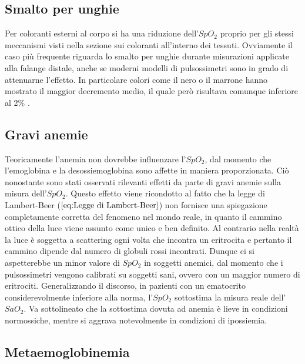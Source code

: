 \documentclass[12pt,a4paper, twoside, openright]{report}
\begin{document}
\subsection{Smalto per unghie}

Per coloranti esterni al corpo si ha una riduzione dell'$SpO_2$ proprio per gli stessi meccanismi visti nella sezione sui coloranti all'interno dei tessuti. 
Ovviamente il caso più frequente riguarda lo smalto per unghie durante misurazioni applicate alla falange distale, anche se moderni modelli di pulsossimetri sono in grado di attenuarne l'effetto. 
In particolare colori come il nero o il marrone hanno mostrato il maggior decremento medio, il quale però risultava comunque inferiore al 2\% \cite{Pulseoximeter}.%


\subsection{Gravi anemie}

Teoricamente l'anemia non dovrebbe influenzare l'$SpO_2$, dal momento che l'emoglobina e la desossiemoglobina sono affette in maniera proporzionata. 
Ciò nonostante sono stati osservati rilevanti effetti da parte di gravi anemie sulla misura dell'$SpO_2$. 
Questo effetto viene ricondotto al fatto che la legge di Lambert-Beer ($\ref{eq:Legge di Lambert-Beer}$) non fornisce una spiegazione completamente corretta del fenomeno nel mondo reale, in quanto il cammino ottico della luce viene assunto come unico e ben definito. 
Al contrario nella realtà la luce è soggetta a scattering ogni volta che incontra un eritrocita e pertanto il cammino dipende dal numero di globuli rossi incontrati. 
Dunque ci si aspetterebbe un minor valore di $SpO_2$ in soggetti anemici, dal momento che i pulsossimetri vengono calibrati su soggetti sani, ovvero con un maggior numero di eritrociti. 
Generalizzando il discorso, in pazienti con un ematocrito considerevolmente inferiore alla norma, l'$SpO_2$ sottostima la misura reale dell'$SaO_2$. 
Va sottolineato che la sottostima dovuta ad anemia è lieve in condizioni normossiche, mentre si aggrava notevolmente in condizioni di ipossiemia.


\subsection{Metaemoglobinemia}
\end{document}

